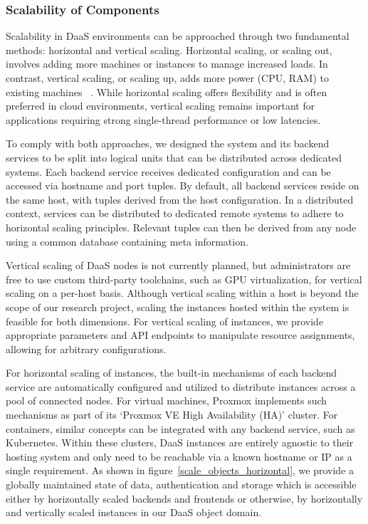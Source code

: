\documentclass[runningheads]{llncs}
\begin{document}
\subsubsection{Scalability of Components}

Scalability in DaaS environments
can be approached through two fundamental methods: horizontal and vertical scaling.
Horizontal scaling, or scaling out, involves adding more machines or instances
to manage increased loads.
In contrast, vertical scaling, or scaling up,
adds more power (CPU, RAM) to existing machines
~\cite{vaquero2011dynamically}.
While horizontal scaling offers flexibility
and is often preferred in cloud environments,
vertical scaling remains important for applications
requiring strong single-thread performance or low latencies.

To comply with both approaches,
we designed the system and its backend services
to be split into logical units that can be distributed across dedicated systems.
Each backend service receives dedicated configuration
and can be accessed via hostname and port tuples.
By default, all backend services reside on the same host,
with tuples derived from the host configuration.
In a distributed context, services can be distributed to dedicated remote systems
to adhere to horizontal scaling principles.
Relevant tuples can then be derived from any node
using a common database containing meta information.

Vertical scaling of DaaS nodes is not currently planned,
but administrators are free to use custom third-party toolchains,
such as GPU virtualization, for vertical scaling on a per-host basis.
Although vertical scaling within a host
is beyond the scope of our research project,
scaling the instances hosted within the system is feasible for both dimensions.
For vertical scaling of instances, we provide appropriate parameters
and API endpoints to manipulate resource assignments,
allowing for arbitrary configurations.

For horizontal scaling of instances, the built-in mechanisms
of each backend service are automatically configured
and utilized to distribute instances across a pool of connected nodes.
For virtual machines, Proxmox implements such mechanisms
as part of its `Proxmox VE High Availability (HA)' cluster.
For containers, similar concepts can be integrated with any backend service,
such as Kubernetes.
Within these clusters,
DaaS instances are entirely agnostic to their hosting system
and only need to be reachable
via a known hostname or IP as a single requirement.
As shown in figure~\ref{scale_objects_horizontal},
we provide a globally maintained state of data, authentication and storage
which is accessible either by horizontally scaled backends and frontends
or otherwise,
by horizontally and vertically scaled instances in our DaaS object domain.
\end{document}
